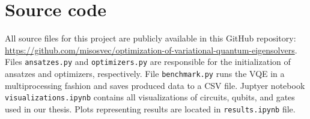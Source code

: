 \chapter{Source code}
All source files for this project are publicly available in this GitHub repository: \url{https://github.com/misosvec/optimization-of-variational-quantum-eigensolvers}. Files \texttt{ansatzes.py} and \texttt{optimizers.py} are responsible for the initialization of ansatzes and optimizers, respectively. File \texttt{benchmark.py} runs the VQE in a multiprocessing fashion and saves produced data to a CSV file. Juptyer notebook \texttt{visualizations.ipynb} contains all visualizations of circuits, qubits, and gates used in our thesis. Plots representing results are located in \texttt{results.ipynb} file.